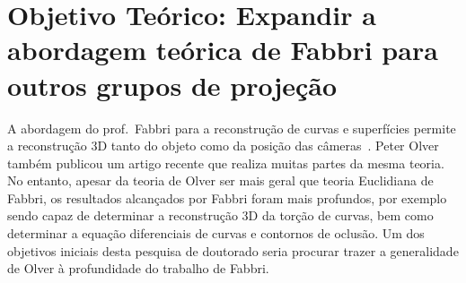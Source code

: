 \documentclass[a4paper,titlepage]{article}
\begin{document}
\section{Objetivo Teórico: Expandir a abordagem teórica de Fabbri para outros
grupos de projeção}

A abordagem do prof.\ Fabbri para a reconstrução de curvas e superfícies permite
a reconstrução 3D tanto do objeto como da posição das
câmeras~\cite{fabbri2016multiview}. Peter Olver também publicou um
artigo recente que realiza muitas partes da mesma teoria. No entanto, apesar da
teoria de Olver ser mais geral que teoria Euclidiana de Fabbri, os resultados
alcançados por Fabbri foram mais profundos, por exemplo sendo capaz de
determinar a reconstrução 3D da torção de curvas, bem como determinar a equação
diferenciais de curvas e contornos de oclusão. Um dos objetivos iniciais desta
pesquisa de doutorado seria procurar trazer a generalidade de Olver à
profundidade do trabalho de Fabbri.
\end{document}

